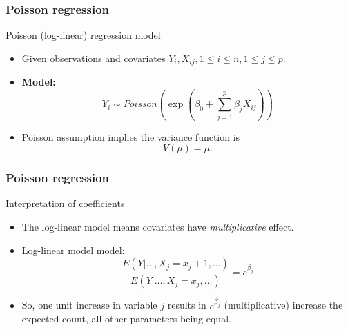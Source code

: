 \documentclass[handout]{beamer}
\begin{document}
   \begin{frame} \frametitle{Poisson regression}

   \begin{block}
       {Poisson (log-linear) regression model}

       \begin{itemize}
       \item      Given observations and covariates
        $Y_i , X_{ij} , 1 \leq i  \leq n, 1 \leq j  \leq p$.


      \item {\bf Model:}
   $$     Y_{i} \sim Poisson \left(\exp\left(\beta_0 + \sum_{j=1}^p \beta_j X_{ij} \right)\right)$$


   \item Poisson assumption implies the  variance
        function is
   $$ V (\mu) = \mu.$$
       \end{itemize}

   \end{block}
   \end{frame}


   \begin{frame} \frametitle{Poisson regression}

   \begin{block}
   {Interpretation of coefficients}

   \begin{itemize}
   \item   The log-linear model
   means covariates have {\em multiplicative} effect.

   \item Log-linear model model:
   $$
   \frac{E(Y|\dots, X_j=x_j+1, \dots)}{E(Y|\dots, X_j=x_j, \dots)} = e^{\beta_j}
   $$


   \item So, one unit increase in variable $j$ results in $e^{\beta_j}$
   (multiplicative) increase the expected count, all other parameters being equal.

   \end{itemize}
   \end{block}
   \end{frame}


   \begin{frame} 

   \end{frame}

   
\end{document}
